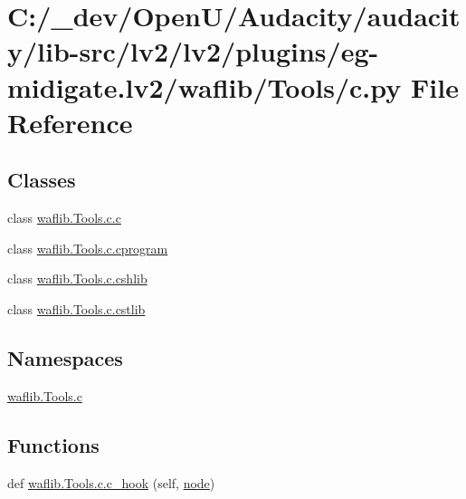 \hypertarget{lv2_2plugins_2eg-midigate_8lv2_2waflib_2_tools_2c_8py}{}\section{C\+:/\+\_\+dev/\+Open\+U/\+Audacity/audacity/lib-\/src/lv2/lv2/plugins/eg-\/midigate.lv2/waflib/\+Tools/c.py File Reference}
\label{lv2_2plugins_2eg-midigate_8lv2_2waflib_2_tools_2c_8py}
\subsection*{Classes}
\begin{DoxyCompactItemize}
\item 
class \hyperlink{classwaflib_1_1_tools_1_1c_1_1c}{waflib.\+Tools.\+c.\+c}
\item 
class \hyperlink{classwaflib_1_1_tools_1_1c_1_1cprogram}{waflib.\+Tools.\+c.\+cprogram}
\item 
class \hyperlink{classwaflib_1_1_tools_1_1c_1_1cshlib}{waflib.\+Tools.\+c.\+cshlib}
\item 
class \hyperlink{classwaflib_1_1_tools_1_1c_1_1cstlib}{waflib.\+Tools.\+c.\+cstlib}
\end{DoxyCompactItemize}
\subsection*{Namespaces}
\begin{DoxyCompactItemize}
\item 
 \hyperlink{namespacewaflib_1_1_tools_1_1c}{waflib.\+Tools.\+c}
\end{DoxyCompactItemize}
\subsection*{Functions}
\begin{DoxyCompactItemize}
\item 
def \hyperlink{namespacewaflib_1_1_tools_1_1c_a133cda6439588809c5d3ccdc6bf3c5d1}{waflib.\+Tools.\+c.\+c\+\_\+hook} (self, \hyperlink{structnode}{node})
\end{DoxyCompactItemize}
